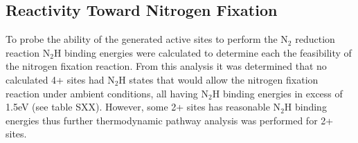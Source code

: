 


\subsection{Reactivity Toward Nitrogen Fixation}

To probe the ability of the generated active sites to perform the N$_2$ reduction reaction N$_2$H binding energies were calculated to determine each the feasibility of the nitrogen fixation reaction. From this analysis it was determined that no calculated 4+ sites had N$_2$H states that would allow the nitrogen fixation reaction under ambient conditions, all having N$_2$H binding energies in excess of 1.5eV (see table SXX). However, some 2+ sites has reasonable N$_2$H binding energies thus further thermodynamic pathway analysis was performed for 2+ sites.

